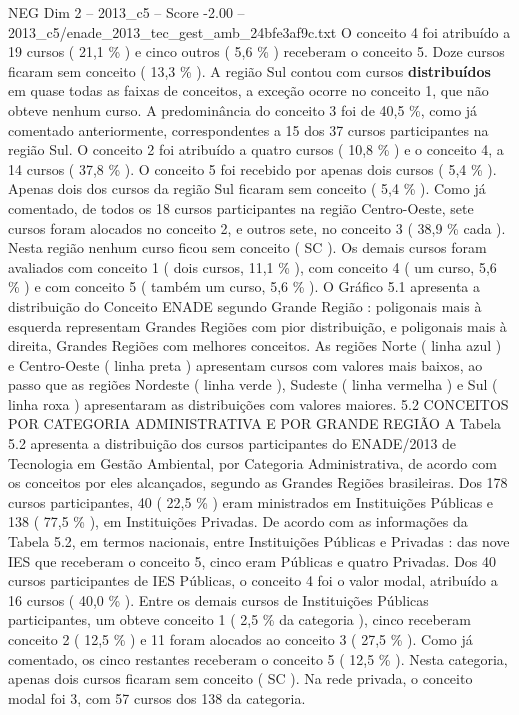 \begin{textsample}{NEG Dim 2 – 2013\_c5 – Score -2.00 – 2013\_c5/enade\_2013\_tec\_gest\_amb\_24bfe3af9c.txt}
O conceito 4 foi atribuído a 19 cursos ( 21,1 \% ) e cinco outros ( 5,6 \% ) receberam o conceito 5.
Doze cursos ficaram sem conceito ( 13,3 \% ).
A região Sul contou com cursos \textbf{distribuídos} em quase todas as faixas de conceitos, a exceção ocorre no conceito 1, que não obteve nenhum curso.
A predominância do conceito 3 foi de 40,5 \%, como já comentado anteriormente, correspondentes a 15 dos 37 cursos participantes na região Sul.
O conceito 2 foi atribuído a quatro cursos ( 10,8 \% ) e o conceito 4, a 14 cursos ( 37,8 \% ).
O conceito 5 foi recebido por apenas dois cursos ( 5,4 \% ).
Apenas dois dos cursos da região Sul ficaram sem conceito ( 5,4 \% ).
Como já comentado, de todos os 18 cursos participantes na região Centro-Oeste, sete cursos foram alocados no conceito 2, e outros sete, no conceito 3 ( 38,9 \% cada ).
Nesta região nenhum curso ficou sem conceito ( SC ).
Os demais cursos foram avaliados com conceito 1 ( dois cursos, 11,1 \% ), com conceito 4 ( um curso, 5,6 \% ) e com conceito 5 ( também um curso, 5,6 \% ).
O Gráfico 5.1 apresenta a distribuição do Conceito ENADE segundo Grande Região : poligonais mais à esquerda representam Grandes Regiões com pior distribuição, e poligonais mais à direita, Grandes Regiões com melhores conceitos.
As regiões Norte ( linha azul ) e Centro-Oeste ( linha preta ) apresentam cursos com valores mais baixos, ao passo que as regiões Nordeste ( linha verde ), Sudeste ( linha vermelha ) e Sul ( linha roxa ) apresentaram as distribuições com valores maiores. 5.2 CONCEITOS POR CATEGORIA ADMINISTRATIVA E POR GRANDE REGIÃO A Tabela 5.2 apresenta a distribuição dos cursos participantes do ENADE/2013 de Tecnologia em Gestão Ambiental, por Categoria Administrativa, de acordo com os conceitos por eles alcançados, segundo as Grandes Regiões brasileiras.
Dos 178 cursos participantes, 40 ( 22,5 \% ) eram ministrados em Instituições Públicas e 138 ( 77,5 \% ), em Instituições Privadas.
De acordo com as informações da Tabela 5.2, em termos nacionais, entre Instituições Públicas e Privadas : das nove IES que receberam o conceito 5, cinco eram Públicas e quatro Privadas.
Dos 40 cursos participantes de IES Públicas, o conceito 4 foi o valor modal, atribuído a 16 cursos ( 40,0 \% ).
Entre os demais cursos de Instituições Públicas participantes, um obteve conceito 1 ( 2,5 \% da categoria ), cinco receberam conceito 2 ( 12,5 \% ) e 11 foram alocados ao conceito 3 ( 27,5 \% ).
Como já comentado, os cinco restantes receberam o conceito 5 ( 12,5 \% ).
Nesta categoria, apenas dois cursos ficaram sem conceito ( SC ).
Na rede privada, o conceito modal foi 3, com 57 cursos dos 138 da categoria.

\end{textsample}

